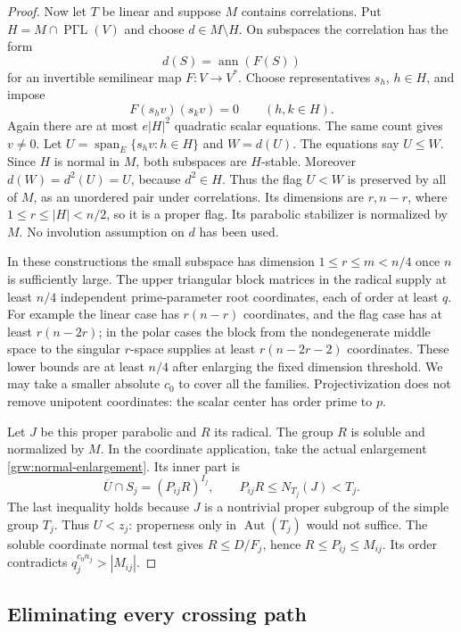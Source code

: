 \begin{proof}
Now let $T$ be linear and suppose $M$ contains correlations.  Put
$H=M\cap\operatorname{P\Gamma L}(V)$ and choose $d\in M\setminus H$.
On subspaces the correlation has the form
\[
 d(S)=\operatorname{ann}(F(S))
\]
for an invertible semilinear map $F:V\longrightarrow V^*$.
Choose representatives $s_h$, $h\in H$, and impose
\[
 F(s_hv)(s_kv)=0\qquad(h,k\in H).
\]
Again there are at most $e|H|^2$ quadratic scalar equations.  The same
count gives $v\ne0$.  Let
$U=\operatorname{span}_E\{s_hv:h\in H\}$ and $W=d(U)$.
The equations say $U\le W$.  Since $H$ is normal in $M$, both subspaces
are $H$-stable.  Moreover $d(W)=d^2(U)=U$, because $d^2\in H$.
Thus the flag $U<W$ is preserved by all of $M$, as an unordered pair
under correlations.  Its dimensions are $r,n-r$, where
$1\le r\le |H|<n/2$, so it is a proper flag.  Its parabolic stabilizer
is normalized by $M$.  No involution assumption on $d$ has been used.

In these constructions the small subspace has dimension
$1\le r\le m<n/4$ once $n$ is sufficiently large.  The upper triangular
block matrices in the radical supply at least $n/4$ independent
prime-parameter root coordinates, each of order at least $q$.
For example the linear case has $r(n-r)$ coordinates, and the flag
case has at least $r(n-2r)$; in the polar cases the block from the
nondegenerate middle space to the singular $r$-space supplies at least
$r(n-2r-2)$ coordinates.  These lower bounds are at least $n/4$ after
enlarging the fixed dimension threshold.  We may take a smaller
absolute $c_0$ to cover all the families.  Projectivization does not
remove unipotent coordinates: the scalar center has order prime to $p$.

Let $J$ be this proper parabolic and $R$ its radical.  The group $R$
is soluble and normalized by $M$.  In the coordinate application,
take the actual enlargement \eqref{grw:normal-enlargement}.  Its inner
part is
\[
 \overline U\cap S_j=(P_{ij}R)^{I_j},\qquad
 P_{ij}R\le N_{T_j}(J)<T_j.
\]
The last inequality holds because $J$ is a nontrivial proper subgroup
of the simple group $T_j$.  Thus $U<z_j$: properness only in
$\operatorname{Aut}(T_j)$ would not suffice.  The soluble coordinate
normal test gives $\widehat R\le D/F_j$, hence
$R\le P_{ij}\le M_{ij}$.  Its order contradicts
$q_j^{c_0n_j}>|M_{ij}|$.
\end{proof}

\subsection{Eliminating every crossing path}

